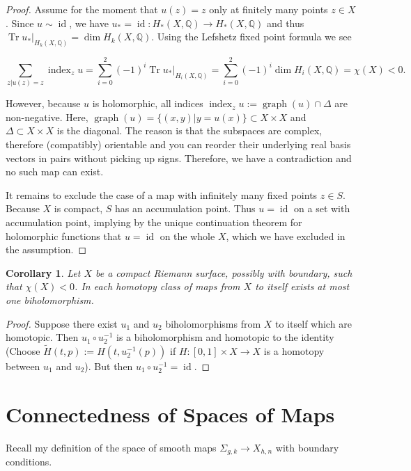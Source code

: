 \documentclass[a4paper]{article}
\newcommand{\QQ}{\mathbb{Q}}
\newcommand{\si}{\Sigma}
\newcommand{\lra}{\longrightarrow}
\newcommand{\wt}[1]{\widetilde{#1}}
\newcommand{\id}{\operatorname{id}}
\newcommand{\ind}{\operatorname{index}}
\newcommand{\grapho}{\operatorname{graph}}
\newcommand{\Trace}{\operatorname{Tr}}
\newtheorem*{cor}{Corollary}
\theoremstyle{definition}
\theoremstyle{remark}
\theoremstyle{remark}
\begin{document}
\begin{proof}
  Assume for the moment that $u(z)=z$ only at finitely many points $z\in X$. Since $u\sim\id$, we have $u_*=\id:H_*(X,\QQ)\lra H_*(X,\QQ)$ and thus $\Trace u_*|_{H_k(X,\QQ)}=\dim H_k(X,\QQ)$. Using the Lefshetz fixed point formula we see

  \begin{equation*}
    \sum_{z|u(z)=z}\ind_z u=\sum_{i=0}^2(-1)^i\Trace u_*|_{H_i(X,\QQ)}=\sum_{i=0}^2(-1)^i\dim H_i(X,\QQ)=\chi(X)<0.
  \end{equation*}

  However, because $u$ is holomorphic, all indices $\ind_z u:=\grapho(u)\cap\Delta$ are non-negative. Here, $\grapho(u)=\{(x,y)|y=u(x)\}\subset X\times X$ and $\Delta\subset X\times X$ is the diagonal. The reason is that the subspaces are complex, therefore (compatibly) orientable and you can reorder their underlying real basis vectors in pairs without picking up signs. Therefore, we have a contradiction and no such map can exist.

  It remains to exclude the case of a map with infinitely many fixed points $z\in S$. Because $X$ is compact, $S$ has an accumulation point. Thus $u=\id$ on a set with accumulation point, implying by the unique continuation theorem for holomorphic functions that $u=\id$ on the whole $X$, which we have excluded in the assumption.
\end{proof}

\begin{cor}
Let $X$ be a compact Riemann surface, possibly with boundary, such that $\chi(X)<0$. In each homotopy class of maps from $X$ to itself exists at most one biholomorphism.
\end{cor}

\begin{proof}
  Suppose there exist $u_1$ and $u_2$ biholomorphisms from $X$ to itself which are homotopic. Then $u_1\circ u_2^{-1}$ is a biholomorphism and homotopic to the identity (Choose $\wt{H}(t,p):=H(t,u_2^{-1}(p))$ if $H:[0,1]\times X\lra X$ is a homotopy between $u_1$ and $u_2$). But then $u_1\circ u_2^{-1}=\id$.
\end{proof}

\section*{Connectedness of Spaces of Maps}

Recall my definition of the space of smooth maps $\si_{g,k}\lra X_{h,n}$ with boundary conditions.
\end{document}
